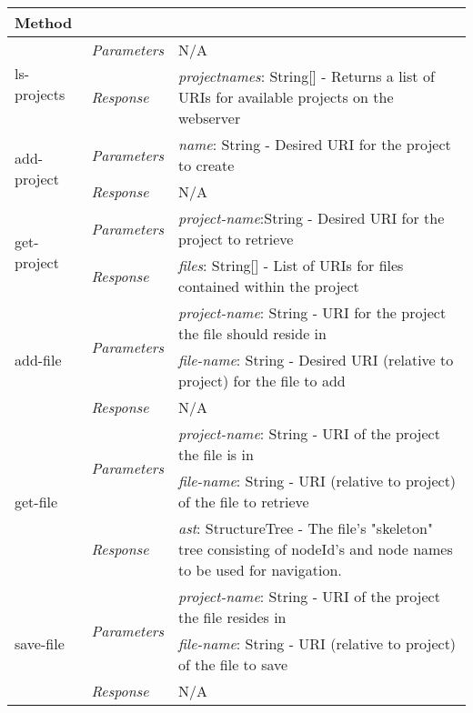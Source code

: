 \begin{table}[h!]
\centering
\begin{tabular}{| m{2.5cm}| m{2.3cm} | m{10.2cm} |}
\hline
Method &  &  \\
\hline \hline
%
\multirow{2}{*}{ls-projects} & \multirow{1}{*}{\emph{Parameters}} & N/A \\ \cline{2-3}
			& \multirow{1}{*}{\emph{Response}} & \emph{projectnames}: String[] - Returns a list of URIs for available projects on the webserver \\ \hline \hline 
%
\multirow{2}{*}{add-project} & \multirow{1}{*}{\emph{Parameters}} & \emph{name}: String - Desired URI for the project to create \\ \cline{2-3}
			& \multirow{1}{*}{\emph{Response}} & N/A \\ \hline \hline
%
\multirow{2}{*}{get-project} & \multirow{1}{*}{\emph{Parameters}} & \emph{project-name}:String - Desired URI for the project to retrieve\\ \cline{2-3}
			& \multirow{1}{*}{\emph{Response}} & \emph{files}: String[] - List of URIs for files contained within the project \\ \hline \hline
%			
\multirow{3}{*}{add-file} & \multirow{2}{*}{\emph{Parameters}} & \emph{project-name}: String - URI for the project the file should reside in \\ \cline{3-3}
 & & \emph{file-name}: String - Desired URI (relative to project) for the file to add \\ \cline{2-3}
			& \multirow{1}{*}{\emph{Response}} & N/A \\ \hline \hline

\multirow{3}{*}{get-file} & \multirow{2}{*}{\emph{Parameters}} & \emph{project-name}: String - URI of the project the file is in \\ \cline{3-3}
 & & \emph{file-name}: String - URI (relative to project) of the file to retrieve \\ \cline{2-3}
			& \multirow{1}{*}{\emph{Response}} & \emph{ast}: StructureTree - The file's "skeleton" tree consisting of nodeId's and node names to be used for navigation. \\ \hline \hline 	
			
\multirow{3}{*}{save-file} & \multirow{2}{*}{\emph{Parameters}} & \emph{project-name}: String - URI of the project the file resides in \\ \cline{3-3}
 & & \emph{file-name}: String -  URI (relative to project) of the file to save \\ \cline{2-3}
			& \multirow{1}{*}{\emph{Response}} & N/A \\ \hline \hline	
			

\end{tabular}
\end{table}
